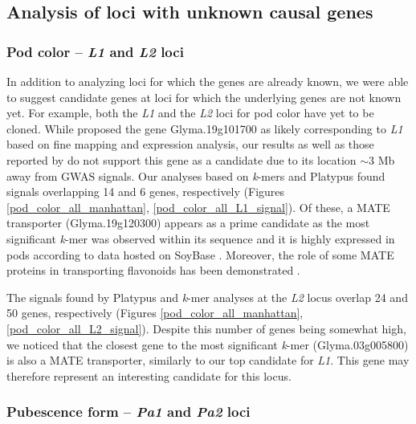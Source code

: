 \subsection*{Analysis of loci with unknown causal genes}
\label{sv-gwas-results}

\subsubsection*{Pod color -- \textit{L1} and \textit{L2} loci}
\label{sv-gwas-main-results-pod-color-l1-l2}

In addition to analyzing loci for which the genes are already known, we were
able to suggest candidate genes at loci for which the underlying genes are not
known yet. For example, both the \textit{L1} and the \textit{L2} loci for pod
color have yet to be cloned. While \cite{he2015} proposed the gene
Glyma.19g101700 as likely corresponding to \textit{L1} based on fine mapping
and expression analysis, our results as well as those reported by
\cite{bandillo2017} do not support this gene as a candidate due to its location
$\sim$3 Mb away from GWAS signals. Our analyses based on
\textit{k}-mers and Platypus found signals overlapping 14 and 6
genes, respectively (Figures \ref{pod_color_all_manhattan},
\ref{pod_color_all_L1_signal}). Of these, a MATE transporter (Glyma.19g120300)
appears as a prime candidate as the most significant \emph{k}-mer was observed
within its sequence and it is highly expressed in pods according to data hosted
on SoyBase \citep{grant2010, severin2010}. Moreover, the role of some MATE
proteins in transporting flavonoids has been demonstrated \citep{chen2015}.

The signals found by Platypus and \emph{k}-mer analyses at the \textit{L2}
locus overlap 24 and 50 genes, respectively (Figures
\ref{pod_color_all_manhattan}, \ref{pod_color_all_L2_signal}). Despite this
number of genes being somewhat high, we noticed that the closest gene to the
most significant \emph{k}-mer (Glyma.03g005800) is also a MATE transporter,
similarly to our top candidate for \emph{L1}. This gene may therefore represent
an interesting candidate for this locus.

\subsubsection*{Pubescence form -- \textit{Pa1} and \textit{Pa2} loci}
\label{sv-gwas-main-results-pubescence-form-pa1-pa2}

